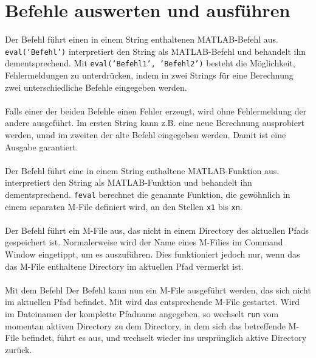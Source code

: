 \section{Befehle auswerten und ausführen} 
Der Befehl  führt einen in einem String enthaltenen MATLAB-Befehl aus. {\color{red}\texttt{eval(`Befehl')}} interpretiert den String als MATLAB-Befehl und behandelt ihn dementsprechend. Mit {\color{red}\texttt{eval(`Befehl1', `Befehl2')}} besteht die Möglichkeit, Fehlermeldungen zu unterdrücken, indem in zwei Strings für eine Berechnung zwei unterschiedliche Befehle eingegeben werden. 
\\\\
Falls einer der beiden Befehle einen Fehler erzeugt, wird ohne Fehlermeldung der andere ausgeführt. Im ersten String kann z.B. eine neue Berechnung ausprobiert werden, unnd im zweiten der alte Befehl eingegeben werden. Damit ist eine Ausgabe garantiert.
\\\\
Der Befehl  führt eine in einem String enthaltene MATLAB-Funktion aus. {} interpretiert den String als MATLAB-Funktion und behandelt ihn dementsprechend. \texttt{feval} berechnet die genannte Funktion, die gewöhnlich in einem separaten M-File definiert wird, an den Stellen \texttt{x1} bis \texttt{xn}.
\\\\
Der Befehl  führt ein M-File aus, das nicht in einem Directory des aktuellen Pfads gespeichert ist. Normalerweise wird der Name eines M-Filies im Command Window eingetippt, um es auszuführen. Dies funktioniert jedoch nur, wenn das das M-File enthaltene Directory im aktuellen Pfad vermerkt ist. 
\\\\
Mit dem Befehl Der Befehl {} kann nun ein M-File ausgeführt werden, das sich nicht im aktuellen Pfad befindet. Mit {} wird das entsprechende M-File gestartet. Wird im Dateinamen der komplette Pfadname angegeben, so wechselt \texttt{run} vom momentan aktiven Directory zu dem Directory, in dem sich das betreffende M-File befindet, führt es aus, und wechselt wieder ins ursprünglich aktive Directory zurück. 



